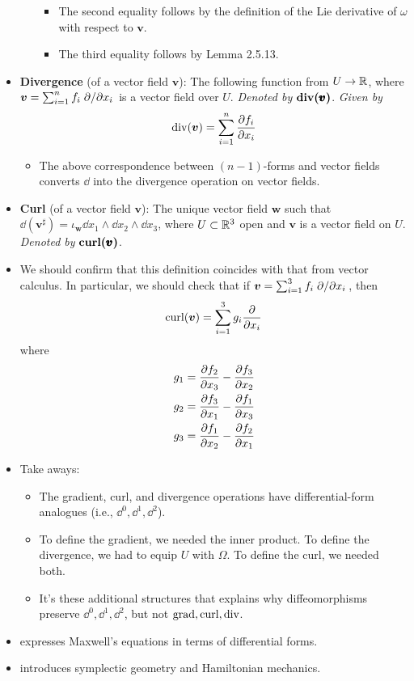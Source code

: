 \documentclass[../notes.tex]{subfiles}
\begin{document}
\begin{itemize}
\begin{itemize}
\begin{itemize}
            \item The second equality follows by the definition of the Lie derivative of $\omega$ with respect to $\bm{v}$.
            \item The third equality follows by Lemma 2.5.13.
        \end{itemize}
    \end{itemize}
    \item \textbf{Divergence} (of a vector field $\bm{v}$): The following function from $U\to\mathbb{R}$, where $\bm{v}=\sum_{i=1}^nf_i\pdv*{x_i}$ is a vector field over $U$. \emph{Denoted by} $\bm{\dvv(\pmb{v})}$. \emph{Given by}
    \begin{equation*}
        \operatorname{div}(\bm{v}) = \sum_{i=1}^n\pdv{f_i}{x_i}
    \end{equation*}
    \begin{itemize}
        \item The above correspondence between $(n-1)$-forms and vector fields converts $\dd$ into the divergence operation on vector fields.
    \end{itemize}
    \item \textbf{Curl} (of a vector field $\bm{v}$): The unique vector field $\bm{w}$ such that $\dd(\bm{v}^\sharp)=\iota_{\bm{w}}\dd{x_1}\wedge\dd{x_2}\wedge\dd{x_3}$, where $U\subset\mathbb{R}^3$ open and $\bm{v}$ is a vector field on $U$. \emph{Denoted by} $\bm{\crl(\pmb{v})}$.
    \item We should confirm that this definition coincides with that from vector calculus. In particular, we should check that if $\bm{v}=\sum_{i=1}^3f_i\pdv*{x_i}$, then
    \begin{equation*}
        \operatorname{curl}(\bm{v}) = \sum_{i=1}^3g_i\pdv{x_i}
    \end{equation*}
    where
    \begin{align*}
        g_1 &= \pdv{f_2}{x_3}-\pdv{f_3}{x_2}\\
        g_2 &= \pdv{f_3}{x_1}-\pdv{f_1}{x_3}\\
        g_3 &= \pdv{f_1}{x_2}-\pdv{f_2}{x_1}
    \end{align*}
    \item Take aways:
    \begin{itemize}
        \item The gradient, curl, and divergence operations have differential-form analogues (i.e., $\dd^0,\dd^1,\dd^2$).
        \item To define the gradient, we needed the inner product. To define the divergence, we had to equip $U$ with $\Omega$. To define the curl, we needed both.
        \item It's these additional structures that explains why diffeomorphisms preserve $\dd^0,\dd^1,\dd^2$, but not $\operatorname{grad},\operatorname{curl},\operatorname{div}$.
    \end{itemize}
    \item \textcite{bib:DifferentialForms} expresses Maxwell's equations in terms of differential forms.
    \item \textcite{bib:DifferentialForms} introduces symplectic geometry and Hamiltonian mechanics.
\end{itemize}
\end{document}
